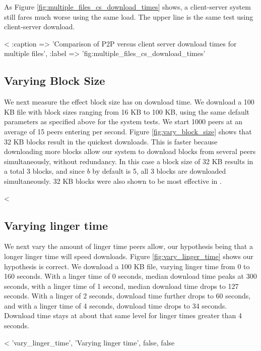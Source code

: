 As Figure \ref{fig:multiple_files_cs_download_times} shows, a client-server system still fares much worse using the same load.  The upper line is the same test using client-server download.

<%
  :caption => 'Comparison of P2P versus client server download times for multiple files', :label => 'fig:multiple_files_cs_download_times' %

\subsection{Varying Block Size}

We next measure the effect block size has on download time. We download a 100 KB file with block sizes ranging from 
16 KB to 100 KB, using the same default parameters as specified above for the system tests.
We start 1000 peers at an average of 15 peers entering per second. Figure \ref{fig:vary_block_size} shows that 32 KB blocks result
in the quickest downloads.  This is faster because downloading more blocks allow our system to download 
blocks from several peers simultaneously, without redundancy.  In this case a block size of 32 KB results in a total 3 blocks, and since $b$ by default is 5, all 3 blocks
are downloaded simultaneously. 32 KB blocks were also shown to be most effective in \cite{32_kb_blocks}.

<%

\subsection{Varying linger time}

We next vary the amount of linger time peers allow, our hypothesis being that a longer linger 
time will speed downloads.  Figure \ref{fig:vary_linger_time} shows our hypothesis is correct.   
We download a 100 KB file, varying linger time from 0 to 160 seconds.
With a linger time of 0 seconds, median download time peaks at 300 seconds, with 
a linger time of 1 second, median download time drops to 127 seconds.  With a linger of 2 seconds, download time further drops to 60 seconds, and
with a linger time of 4 seconds, download time drops to 34 seconds.  Download time stays at about that same level for linger times greater than 4 seconds.

<%
 'vary_linger_time', 'Varying linger time', false, false %


